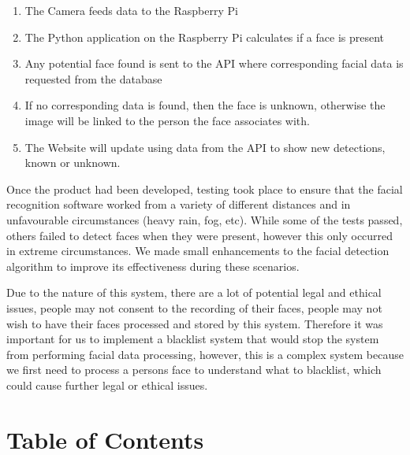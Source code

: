 \documentclass[
  english,
  a4paper,
,tablecaptionabove
]{scrartcl}
\providecommand{\tightlist}{%
  \setlength{\itemsep}{0pt}\setlength{\parskip}{0pt}}
\begin{document}
\begin{enumerate}
\def\labelenumi{\arabic{enumi}.}
\tightlist
\item
  The Camera feeds data to the Raspberry Pi
\item
  The Python application on the Raspberry Pi calculates if a face is
  present
\item
  Any potential face found is sent to the API where corresponding facial
  data is requested from the database
\item
  If no corresponding data is found, then the face is unknown, otherwise
  the image will be linked to the person the face associates with.
\item
  The Website will update using data from the API to show new
  detections, known or unknown.
\end{enumerate}

Once the product had been developed, testing took place to ensure that
the facial recognition software worked from a variety of different
distances and in unfavourable circumstances (heavy rain, fog, etc).
While some of the tests passed, others failed to detect faces when they
were present, however this only occurred in extreme circumstances. We
made small enhancements to the facial detection algorithm to improve its
effectiveness during these scenarios.

Due to the nature of this system, there are a lot of potential legal and
ethical issues, people may not consent to the recording of their faces,
people may not wish to have their faces processed and stored by this
system. Therefore it was important for us to implement a blacklist
system that would stop the system from performing facial data
processing, however, this is a complex system because we first need to
process a persons face to understand what to blacklist, which could
cause further legal or ethical issues.

\newpage

\hypertarget{table-of-contents}{%
\section{Table of Contents}\label{table-of-contents}}
\end{document}
